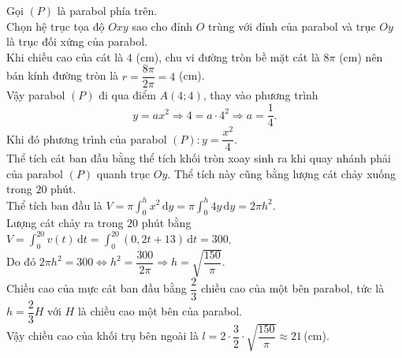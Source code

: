 \begin{bt}
{\begin{center}
		\end{center}
		Gọi $(P)$ là parabol phía trên.\\ Chọn hệ trục tọa độ $Oxy$ sao cho đỉnh $O$ trùng với đỉnh của parabol và trục $Oy$ là trục đối xứng của parabol.\\ Khi chiều cao của cát là $4$ (cm), chu vi đường tròn bề mặt cát là $8\pi$ (cm) nên bán kính đường tròn là $r=\dfrac{8\pi}{2\pi}=4$ (cm).\\ 
		Vậy  parabol $(P)$ đi qua điểm $A(4;4)$, thay vào phương trình $$y=ax^2\Rightarrow 4=a\cdot4^2\Rightarrow a=\dfrac{1}{4}.$$
		Khi đó phương trình  của parabol $(P)\colon y=\dfrac{x^2}{4}$.\\
		Thể tích  cát ban đầu bằng thể tích khối tròn xoay sinh ra khi quay nhánh phải của parabol $(P)$ quanh trục $Oy$. Thể tích này cũng bằng lượng cát chảy xuống trong $20$ phút.\\
		Thể tích  ban đầu là $V=\pi\displaystyle\int_{0}^{h}x^2\,\mathrm{d}y=\pi\displaystyle\int_{0}^{h}4y\,\mathrm{d}y=2\pi h^2$.\\
		Lượng cát chảy ra trong $20$ phút bằng  $V=\displaystyle\int_{0}^{20}v(t)\,\mathrm{d}t=\displaystyle\int_{0}^{20}(0{,}2t+13)\,\mathrm{d}t=300$.\\
		Do đó $2\pi h^2=300\Leftrightarrow h^2=\dfrac{300}{2\pi}\Rightarrow  h=\sqrt{\dfrac{150}{\pi}}$.\\
		Chiều cao của mực cát ban đầu bằng $\dfrac{2}{3}$ chiều  cao của một bên parabol, tức là $h=\dfrac{2}{3}H$ với $H$ là chiều cao một bên của parabol.\\
		Vậy chiều cao của khối  trụ bên ngoài là $l=2\cdot\dfrac{3}{2}\cdot\sqrt{\dfrac{150}{\pi}}\approx21$\,(cm).
	} 
\end{bt}

